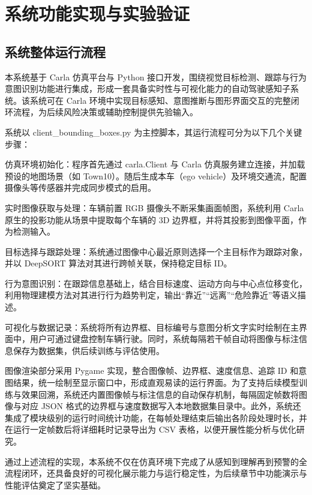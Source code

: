 \chapter{系统功能实现与实验验证}

\section{系统整体运行流程}

本系统基于 Carla 仿真平台与 Python 接口开发，围绕视觉目标检测、跟踪与行为意图识别功能进行集成，形成一套具备实时性与可视化能力的自动驾驶感知子系统。该系统可在 Carla 环境中实现目标感知、意图推断与图形界面交互的完整闭环流程，为后续风险决策或辅助控制提供先验输入。

系统以 client\_bounding\_boxes.py 为主控脚本，其运行流程可分为以下几个关键步骤：

仿真环境初始化：程序首先通过 carla.Client 与 Carla 仿真服务建立连接，并加载预设的地图场景（如 Town10）。随后生成本车（ego vehicle）及环境交通流，配置摄像头等传感器并完成同步模式的启用。

实时图像获取与处理：车辆前置 RGB 摄像头不断采集画面帧图，系统利用 Carla 原生的投影功能从场景中提取每个车辆的 3D 边界框，并将其投影到图像平面，作为检测输入。

目标选择与跟踪处理：系统通过图像中心最近原则选择一个主目标作为跟踪对象，并以 DeepSORT 算法对其进行跨帧关联，保持稳定目标 ID。

行为意图识别：在跟踪信息基础上，结合目标速度、运动方向与中心点位移变化，利用物理建模方法对其进行行为趋势判定，输出“靠近”“远离”“危险靠近”等语义描述。

可视化与数据记录：系统将所有边界框、目标编号与意图分析文字实时绘制在主界面中，用户可通过键盘控制车辆行驶。同时，系统每隔若干帧自动将图像与标注信息保存为数据集，供后续训练与评估使用。

图像渲染部分采用 Pygame 实现，整合图像帧、边界框、速度信息、追踪 ID 和意图结果，统一绘制至显示窗口中，形成直观易读的运行界面。为了支持后续模型训练与效果回溯，系统还内置图像帧与标注信息的自动保存机制，每隔固定帧数将图像与对应 JSON 格式的边界框与速度数据写入本地数据集目录中。此外，系统还集成了模块级别的运行时间统计功能，在每帧处理结束后输出各阶段处理时长，并在运行一定帧数后将详细耗时记录导出为 CSV 表格，以便开展性能分析与优化研究。

通过上述流程的实现，本系统不仅在仿真环境下完成了从感知到理解再到预警的全流程闭环，还具备良好的可视化展示能力与运行稳定性，为后续章节中功能演示与性能评估奠定了坚实基础。

